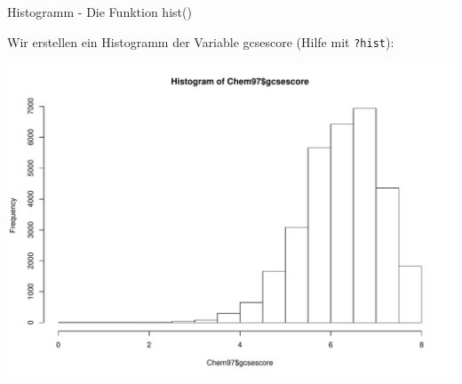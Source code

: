 \documentclass[ignorenonframetext,]{beamer}
\newenvironment{Shaded}{}{}
\newcommand{\KeywordTok}[1]{\textcolor[rgb]{0.00,0.44,0.13}{\textbf{{#1}}}}
\newcommand{\NormalTok}[1]{{#1}}
\begin{document}
\begin{frame}[fragile]{Histogramm - Die Funktion hist()}

Wir erstellen ein Histogramm der Variable gcsescore (Hilfe mit
\texttt{?hist}):

\begin{Shaded}
\end{Shaded}

\includegraphics{R_intern_files/figure-beamer/unnamed-chunk-198-1.pdf}

\end{frame}
\end{document}
